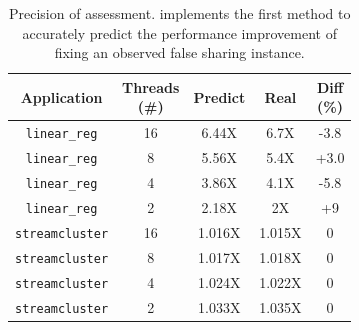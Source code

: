\begin{table}
  \small
  \centering
  \begin{tabular}{ c | c | c | c | c}
  \hline
  \textbf{Application} & \specialcell{Threads \\ (\#)} & \textbf{Predict} & \textbf{Real} & \specialcell{Diff \\ (\%)}\\ \hline
\texttt{linear\_reg} & 16 & 6.44X    & 6.7X & {-3.8}\\
\texttt{linear\_reg}& 8  & 5.56X    & 5.4X & {+3.0}\\
\texttt{linear\_reg} & 4  & 3.86X  & 4.1X  & {-5.8}\\
 \texttt{linear\_reg}& 2  & 2.18X  & 2X    & {+9}\\ \hline
 \texttt{streamcluster} & 16 & 1.016X    & 1.015X &  {0}\\
 \texttt{streamcluster} & 8 & 1.017X    & 1.018X & {0}\\
 \texttt{streamcluster} & 4 & 1.024X    & 1.022X & {0}\\
 \texttt{streamcluster} & 2 & 1.033X    & 1.035X & {0}
\end{tabular}
  \caption{
    Precision of assessment. \Cheetah{} implements the first method to accurately predict the performance improvement of fixing an observed false sharing instance. \label{tbl: precision}}
\end{table}

